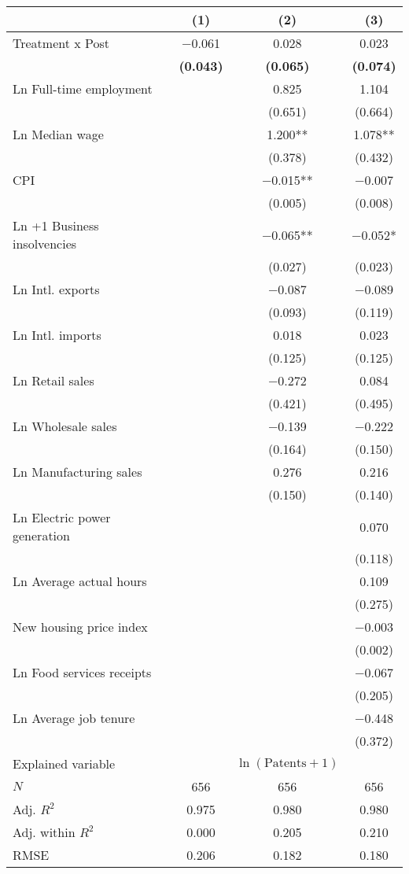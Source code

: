 
\begin{tabular}[t]{lccc}
\toprule
  & (1) & (2) & (3)\\
\midrule
Treatment x Post & \num{-0.061} & \num{0.028} & \num{0.023}\\
\textbf{} & \textbf{(\num{0.043})} & \textbf{(\num{0.065})} & \textbf{(\num{0.074})}\\
Ln Full-time employment &  & \num{0.825} & \num{1.104}\\
 &  & (\num{0.651}) & (\num{0.664})\\
Ln Median wage &  & \num{1.200}** & \num{1.078}**\\
 &  & (\num{0.378}) & (\num{0.432})\\
CPI &  & \num{-0.015}** & \num{-0.007}\\
 &  & (\num{0.005}) & (\num{0.008})\\
Ln +1 Business insolvencies &  & \num{-0.065}** & \num{-0.052}*\\
 &  & (\num{0.027}) & (\num{0.023})\\
Ln Intl. exports &  & \num{-0.087} & \num{-0.089}\\
 &  & (\num{0.093}) & (\num{0.119})\\
Ln Intl. imports &  & \num{0.018} & \num{0.023}\\
 &  & (\num{0.125}) & (\num{0.125})\\
Ln Retail sales &  & \num{-0.272} & \num{0.084}\\
 &  & (\num{0.421}) & (\num{0.495})\\
Ln Wholesale sales &  & \num{-0.139} & \num{-0.222}\\
 &  & (\num{0.164}) & (\num{0.150})\\
Ln Manufacturing sales &  & \num{0.276} & \num{0.216}\\
 &  & (\num{0.150}) & (\num{0.140})\\
Ln Electric power generation &  &  & \num{0.070}\\
 &  &  & (\num{0.118})\\
Ln Average actual hours &  &  & \num{0.109}\\
 &  &  & (\num{0.275})\\
New housing price index &  &  & \num{-0.003}\\
 &  &  & (\num{0.002})\\
Ln Food services receipts &  &  & \num{-0.067}\\
 &  &  & (\num{0.205})\\
Ln Average job tenure &  &  & \num{-0.448}\\
 &  &  & (\num{0.372})\\
\midrule
Explained variable &  & $\ln(\text{Patents}+1)$ & \\
$N$ & \num{656} & \num{656} & \num{656}\\
Adj. $R^2$ & \num{0.975} & \num{0.980} & \num{0.980}\\
Adj. within $R^2$ & \num{0.000} & \num{0.205} & \num{0.210}\\
RMSE & \num{0.206} & \num{0.182} & \num{0.180}\\
\bottomrule
\end{tabular}
